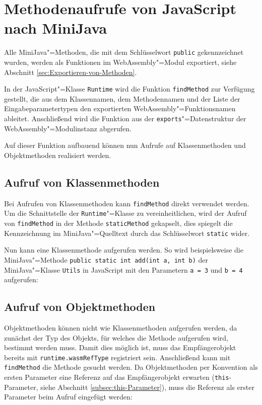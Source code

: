 \section{Methodenaufrufe von JavaScript nach MiniJava}

Alle MiniJava"=Methoden, die mit dem Schlüsselwort \lstinline{public} gekennzeichnet wurden, werden als Funktionen im WebAssembly"=Modul exportiert, siehe Abschnitt \ref{sec:Exportieren-von-Methoden}.

In der JavaScript"=Klasse \lstinline{Runtime} wird die Funktion \lstinline{findMethod} zur Verfügung gestellt, die aus dem Klassennamen, dem Methodennamen und der Liste der Eingabeparametertypen den exportierten WebAssembly"=Funktionsnamen ableitet. Anschließend wird die Funktion aus der \lstinline{exports}"=Datenstruktur der WebAssembly"=Modulinstanz abgerufen.

\pagebreak


Auf dieser Funktion aufbauend können nun Aufrufe auf Klassenmethoden und Objektmethoden realisiert werden.

\subsection{Aufruf von Klassenmethoden}

Bei Aufrufen von Klassenmethoden kann \lstinline{findMethod} direkt verwendet werden. Um die Schnittstelle der \lstinline{Runtime}"=Klasse zu vereinheitlichen, wird der Aufruf von \lstinline{findMethod} in der Methode \lstinline{staticMethod} gekapselt, dies spiegelt die Kennzeichnung im MiniJava"=Quelltext durch das Schlüsselwort \lstinline{static} wider.



Nun kann eine Klassenmethode aufgerufen werden. So wird beispielsweise die MiniJava"=Methode \lstinline{public static int add(int a, int b)} der MiniJava"=Klasse \lstinline{Utils} in JavaScript mit den Parametern \lstinline{a = 3} und \lstinline{b = 4} aufgerufen:



\subsection{Aufruf von Objektmethoden}

Objektmethoden können nicht wie Klassenmethoden aufgerufen werden, da zunächst der Typ des Objekts, für welches die Methode aufgerufen wird, bestimmt werden muss. Damit dies möglich ist, muss das Empfängerobjekt bereits mit \lstinline{runtime.wasmRefType} registriert sein. Anschließend kann mit \lstinline{findMethod} die Methode gesucht werden. Da Objektmethoden per Konvention als ersten Parameter eine Referenz auf das Empfängerobjekt erwarten (\lstinline{this}-Parameter, siehe Abschnitt \ref{subsec:this-Parameter}), muss die Referenz als erster Parameter beim Aufruf eingefügt werden:

